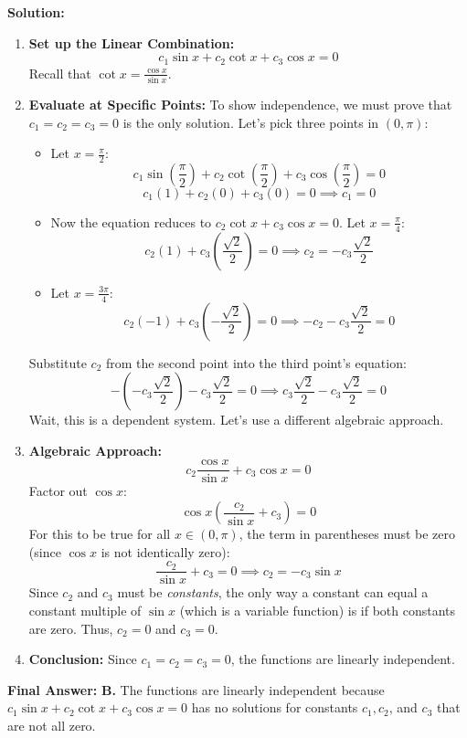 \documentclass[11pt, a4paper]{article}
\theoremstyle{definition}
\theoremstyle{remark}
\begin{document}
\textbf{Solution:}
\begin{enumerate}
    \item \textbf{Set up the Linear Combination:}
    \[ c_1 \sin x + c_2 \cot x + c_3 \cos x = 0 \]
    Recall that $\cot x = \frac{\cos x}{\sin x}$.
    \item \textbf{Evaluate at Specific Points:} To show independence, we must prove that $c_1 = c_2 = c_3 = 0$ is the only solution. Let's pick three points in $(0, \pi)$:
    \begin{itemize}
        \item Let $x = \frac{\pi}{2}$:
        \[ c_1 \sin\left(\frac{\pi}{2}\right) + c_2 \cot\left(\frac{\pi}{2}\right) + c_3 \cos\left(\frac{\pi}{2}\right) = 0 \]
        \[ c_1(1) + c_2(0) + c_3(0) = 0 \implies c_1 = 0 \]
        \item Now the equation reduces to $c_2 \cot x + c_3 \cos x = 0$. Let $x = \frac{\pi}{4}$:
        \[ c_2(1) + c_3\left(\frac{\sqrt{2}}{2}\right) = 0 \implies c_2 = -c_3\frac{\sqrt{2}}{2} \]
        \item Let $x = \frac{3\pi}{4}$:
        \[ c_2(-1) + c_3\left(-\frac{\sqrt{2}}{2}\right) = 0 \implies -c_2 - c_3\frac{\sqrt{2}}{2} = 0 \]
    \end{itemize}
    Substitute $c_2$ from the second point into the third point's equation:
    \[ -\left(-c_3\frac{\sqrt{2}}{2}\right) - c_3\frac{\sqrt{2}}{2} = 0 \implies c_3\frac{\sqrt{2}}{2} - c_3\frac{\sqrt{2}}{2} = 0 \]
    Wait, this is a dependent system. Let's use a different algebraic approach.
    \item \textbf{Algebraic Approach:}
    \[ c_2 \frac{\cos x}{\sin x} + c_3 \cos x = 0 \]
    Factor out $\cos x$:
    \[ \cos x \left( \frac{c_2}{\sin x} + c_3 \right) = 0 \]
    For this to be true for all $x \in (0, \pi)$, the term in parentheses must be zero (since $\cos x$ is not identically zero):
    \[ \frac{c_2}{\sin x} + c_3 = 0 \implies c_2 = -c_3 \sin x \]
    Since $c_2$ and $c_3$ must be \textit{constants}, the only way a constant can equal a constant multiple of $\sin x$ (which is a variable function) is if both constants are zero. Thus, $c_2 = 0$ and $c_3 = 0$.
    \item \textbf{Conclusion:} Since $c_1 = c_2 = c_3 = 0$, the functions are linearly independent.
\end{enumerate}
\textbf{Final Answer:} \textbf{B.} The functions are linearly independent because $c_1 \sin x + c_2 \cot x + c_3 \cos x = 0$ has no solutions for constants $c_1, c_2$, and $c_3$ that are not all zero.
\end{document}
